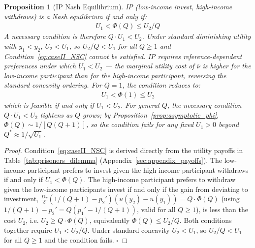 \documentclass[
    oneside,
    fontsize=10pt,leqno]{article}
\newtheorem{prop}{Proposition}
\begin{document}
\begin{prop}[IP Nash Equilibrium]\label{prop:caseII}
IP (low-income invest, high-income withdraws) is a Nash equilibrium if and
only if:
\begin{gather}
U_{1}<\Phi(Q)\leq U_{2}/Q\label{eq:caseII_NSC}
\end{gather}
A necessary condition is therefore $Q\cdot U_{1}<U_{2}$. Under
standard diminishing utility with $y_{1}<y_{2}$, $U_{2}<U_{1}$,
so $U_{2}/Q<U_{1}$ for all $Q\geq1$ and Condition~\eqref{eq:caseII_NSC}
cannot be satisfied. IP requires reference-dependent preferences
under which $U_{1}<U_{2}$ --- the marginal utility cost of $\overline{\nu}$
is higher for the low-income participant than for the high-income participant, reversing the
standard concavity ordering. For $Q=1$, the condition reduces to:
\begin{align}
U_{1}<\Phi(1)\leq U_{2}\label{eq:caseII_Q1}
\end{align}
which is feasible if and only if $U_{1}<U_{2}$. For general $Q$,
the necessary condition $Q\cdot U_{1}<U_{2}$ tightens as $Q$ grows;
by Proposition~\ref{prop:asymptotic_phi}, $\Phi(Q)\sim1/[Q(Q+1)]$,
so the condition fails for any fixed $U_{1}>0$ beyond
$Q^{*}\approx1/\sqrt{U_{1}}$.
\end{prop}

\begin{proof}
Condition~\eqref{eq:caseII_NSC} is derived directly from the utility
payoffs in Table~\ref{tab:prisoners_dilemma} (Appendix~\ref{sec:appendix_payoffs}). The low-income participant
prefers to invest given the high-income participant withdraws if and only if
$U_{1}<\Phi(Q)$. The high-income participant prefers to withdraw given the
low-income participants invest if and only if the gain from deviating to investment,
$\frac{D_{T}}{\delta}(1/(Q+1)-p_{2}')(u(y_{2})-u(y_{1}))=Q\cdot\Phi(Q)$
(using $1/(Q+1)-p_{2}'=Q(p_{1}'-1/(Q+1))$, valid for all $Q\geq1$),
is less than the cost $U_{2}$, i.e. $U_{2}\geq Q\cdot\Phi(Q)$,
equivalently $\Phi(Q)\leq U_{2}/Q$. Both conditions together require
$U_{1}<U_{2}/Q$. Under standard concavity $U_{2}<U_{1}$, so
$U_{2}/Q<U_{1}$ for all $Q\geq1$ and the condition fails. $\square$
\end{proof}

\medskip
\end{document}
